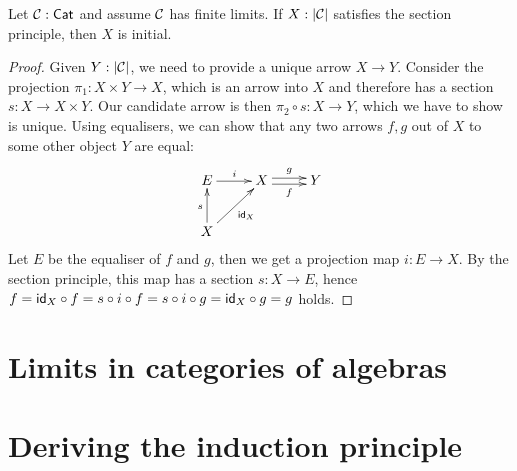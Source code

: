 \begin{lemma}
\label{thm:secToInit}
  Let $\mathcal{C}: \mathsf{Cat}$ and assume $\mathcal{C}$ has finite limits. If $X : | \mathcal{C} |$
  satisfies the section principle, then $X$ is initial.
\end{lemma}
\begin{proof}
  Given $Y : |\mathcal{C}|$, we need to provide a unique arrow $X \to
  Y$. Consider the projection $\pi_1 : X \times Y \to X$, which is an
  arrow into $X$ and therefore has a section $s : X \to X \times
  Y$. Our candidate arrow is then $\pi_2 \circ s : X \to Y$, which we
  have to show is unique. Using equalisers, we can show that any two
  arrows $f,g$ out of $X$ to some other object $Y$ are equal:
\[
\xymatrix{
E \ar[r]^{i} &X \ar@<-.5ex>[r]_-{f} \ar@<.5ex>[r]^-{g} &Y \\
X \ar[u]^{s} \ar[ur]_{\id_{X}}
}
\]
Let $E$ be the equaliser of $f$ and $g$, then we get a projection map
$i : E \to X$. By the section principle, this map has a section
$s : X \to E$, hence
$f = \mathsf{id}_X \circ f = s \circ i \circ f = s \circ i \circ g = \mathsf{id}_X
\circ g = g$ holds.
\end{proof}

\section{Limits in categories of algebras}

\section{Deriving the induction principle}
